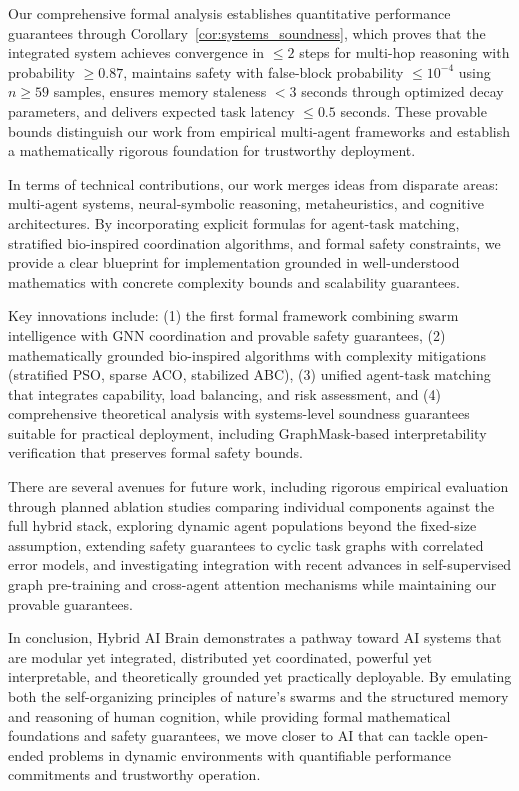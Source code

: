 \documentclass{article}
\begin{document}
Our comprehensive formal analysis establishes quantitative performance guarantees through Corollary~\ref{cor:systems_soundness}, which proves that the integrated system achieves convergence in $\leq 2$ steps for multi-hop reasoning with probability $\geq 0.87$, maintains safety with false-block probability $\leq 10^{-4}$ using $n \geq 59$ samples, ensures memory staleness $< 3$ seconds through optimized decay parameters, and delivers expected task latency $\leq 0.5$ seconds. These provable bounds distinguish our work from empirical multi-agent frameworks and establish a mathematically rigorous foundation for trustworthy deployment.

In terms of technical contributions, our work merges ideas from disparate areas: multi-agent systems, neural-symbolic reasoning, metaheuristics, and cognitive architectures. By incorporating explicit formulas for agent-task matching, stratified bio-inspired coordination algorithms, and formal safety constraints, we provide a clear blueprint for implementation grounded in well-understood mathematics with concrete complexity bounds and scalability guarantees.

Key innovations include: (1) the first formal framework combining swarm intelligence with GNN coordination and provable safety guarantees, (2) mathematically grounded bio-inspired algorithms with complexity mitigations (stratified PSO, sparse ACO, stabilized ABC), (3) unified agent-task matching that integrates capability, load balancing, and risk assessment, and (4) comprehensive theoretical analysis with systems-level soundness guarantees suitable for practical deployment, including GraphMask-based interpretability verification that preserves formal safety bounds.

There are several avenues for future work, including rigorous empirical evaluation through planned ablation studies comparing individual components against the full hybrid stack, exploring dynamic agent populations beyond the fixed-size assumption, extending safety guarantees to cyclic task graphs with correlated error models, and investigating integration with recent advances in self-supervised graph pre-training and cross-agent attention mechanisms while maintaining our provable guarantees.

In conclusion, Hybrid AI Brain demonstrates a pathway toward AI systems that are modular yet integrated, distributed yet coordinated, powerful yet interpretable, and theoretically grounded yet practically deployable. By emulating both the self-organizing principles of nature's swarms and the structured memory and reasoning of human cognition, while providing formal mathematical foundations and safety guarantees, we move closer to AI that can tackle open-ended problems in dynamic environments with quantifiable performance commitments and trustworthy operation.
\end{document}
